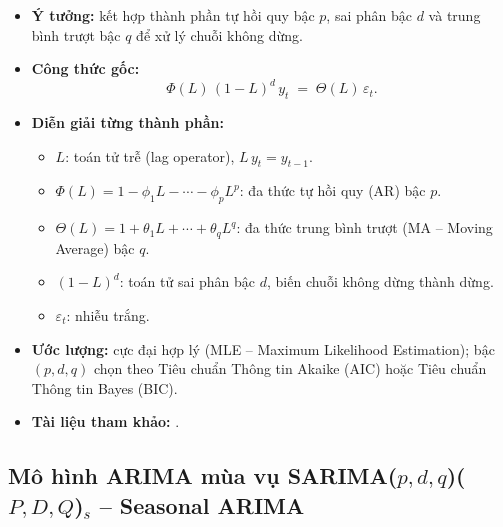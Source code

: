 \documentclass[12pt,a4paper,openany,oneside]{report}
\numberwithin{equation}{chapter}
\begin{document}
\begin{itemize}[leftmargin=18pt,topsep=2pt,itemsep=4pt]
  \item \textbf{Ý tưởng:} kết hợp thành phần tự hồi quy bậc $p$, sai
        phân bậc $d$ và trung bình trượt bậc $q$ để xử lý chuỗi không
        dừng.
  \item \textbf{Công thức gốc:}
        \begin{equation}
          \Phi(L)\,(1-L)^{d}\, y_t \;=\; \Theta(L)\,\varepsilon_t.
          \label{eq:arima}
        \end{equation}
  \item \textbf{Diễn giải từng thành phần:}
        \begin{itemize}[leftmargin=14pt,topsep=2pt,itemsep=1pt]
          \item $L$: toán tử trễ (lag operator), $L\,y_t = y_{t-1}$.
          \item $\Phi(L) = 1 - \phi_1 L - \cdots - \phi_p L^p$: đa thức
                tự hồi quy (AR) bậc $p$.
          \item $\Theta(L) = 1 + \theta_1 L + \cdots + \theta_q L^q$: đa
                thức trung bình trượt (MA -- Moving Average) bậc $q$.
          \item $(1-L)^d$: toán tử sai phân bậc $d$, biến chuỗi không
                dừng thành dừng.
          \item $\varepsilon_t$: nhiễu trắng.
        \end{itemize}
  \item \textbf{Ước lượng:} cực đại hợp lý (MLE -- Maximum Likelihood
        Estimation); bậc $(p,d,q)$ chọn theo Tiêu chuẩn Thông tin Akaike
        (AIC) hoặc Tiêu chuẩn Thông tin Bayes (BIC).
  \item \textbf{Tài liệu tham khảo:} \citet{BoxJenkinsReinsel2008}.
\end{itemize}

\subsection{Mô hình ARIMA mùa vụ SARIMA($p,d,q$)($P,D,Q$)$_s$ -- Seasonal ARIMA}
\end{document}
